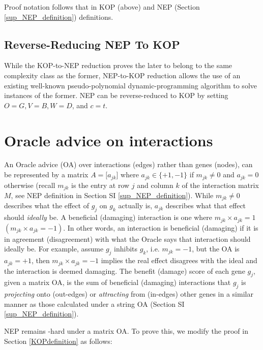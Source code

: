 \documentclass[12pt]{article}	%
\newcommand{\myC}[1]{{\relsize{-1}{$\mathcal{#1}$}}} %
\begin{document}
						\vspace{4pt}\noindent Proof notation follows that in KOP (above) and NEP (Section \ref{sup_NEP_definition}) definitions.

\subsection{Reverse-Reducing NEP To KOP}\label{reverse_reduction}
			While the KOP-to-NEP reduction proves the later to belong to the same complexity class as
			the former, NEP-to-KOP reduction allows the use of an existing well-known pseudo-polynomial dynamic-programming algorithm  \cite{pisinger_where_2005}
			to solve instances of the former. NEP can be reverse-reduced to KOP by setting $O=G, V=B, W=D$, and \textbf{$c=t$}.

\newpage
\section{Oracle advice on interactions}\label{matrix_OA}
        An Oracle advice (OA) over interactions (edges) rather than genes (nodes), can be represented by a matrix $A=\big [a_{jk}\big ]$ where  $a_{jk}\in\{+1,-1\}$ if $m_{jk}\neq 0$ and $a_{jk}=0$ otherwise (recall $m_{jk}$ is the entry at row $j$ and column $k$ of the interaction matrix $M$, see NEP definition in Section SI \ref{sup_NEP_definition}).  While $m_{jk}\neq 0$ describes what the effect of $g_j$  on $g_k$ actually is, $a_{jk}$ describes what that effect should \textit{ideally} be. A beneficial (damaging) interaction is one where $m_{jk} \times a_{jk} = 1 $ $(m_{jk}\times a_{jk}=-1)$. In other words, an interaction is beneficial (damaging) if it is in agreement (disagreement) with what the Oracle says that interaction should ideally be.  For example, assume $g_j$ inhibits $g_k$, i.e. $m_{jk}=-1$,  but the OA is $a_{jk}=+1$, then $m_{jk}\times a_{jk}=-1$ implies the real effect disagrees with the ideal and the interaction is deemed damaging. The benefit (damage) score of each gene $g_j$, given a matrix OA, is the sum of beneficial (damaging) interactions that $g_j$ is \textit{projecting} onto (out-edges) or \textit{attracting} from (in-edges) other genes in a similar manner as those calculated under a string OA (Section SI \ref{sup_NEP_definition}).

        NEP remains \myC{NP}-hard under a matrix OA. To prove this, we modify the proof in  Section  \ref{KOPdefinition} as follows:
\end{document}
